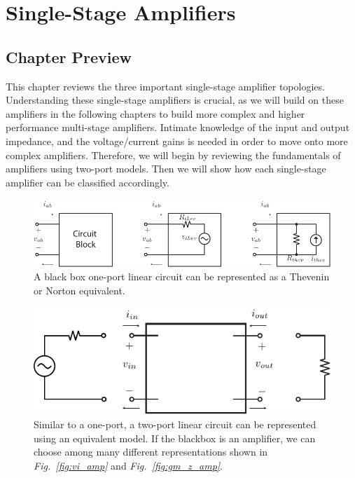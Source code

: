 \chapter{Single-Stage Amplifiers}
\label{ch:ch12_amps_single_stage}
\graphicspath{{./figs_amps_single_stage/}}
\section{Chapter Preview}
This chapter reviews the three important single-stage amplifier topologies.  Understanding these single-stage amplifiers is crucial, as we will build on these amplifiers in the following chapters to build more complex and higher performance multi-stage amplifiers.  Intimate knowledge of the input and output impedance, and the voltage/current gains is needed in order to move onto more complex amplifiers.  Therefore, we will begin by reviewing the fundamentals of amplifiers using two-port models.  Then we will show how each single-stage amplifier can be classified accordingly.
\newpage
\begin{figure}[tb]
\centering
\includegraphics[scale=1]{oneports}
\caption{A black box one-port linear circuit can be represented as a Thevenin or Norton equivalent.}
\label{fig:oneports}
\end{figure}
\begin{figure}[H]
\centering
\includegraphics[scale=1.05]{2port_ss}
\caption{Similar to a one-port, a two-port linear circuit can be represented using an equivalent model.  If the blackbox is an amplifier, we can choose among many different representations shown in \emph{Fig.~\ref{fig:vi_amp}} and \emph{Fig.~\ref{fig:gm_z_amp}}.}
\label{fig:2port_ss}
\end{figure}
